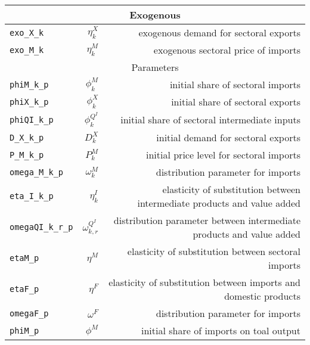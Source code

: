 \begin{center}
\begin{longtable}{lrr}
\hline
\multicolumn{3}{c}{Exogenous}\\%
\hline
\texttt{exo\_X\_k} & ${\eta^{X}_{k}}$ & exogenous demand for sectoral exports\\
\texttt{exo\_M\_k} & ${\eta^{M}_{k}}$ & exogenous sectoral price of imports\\
\hline
\multicolumn{3}{c}{Parameters}\\%
\hline
\texttt{phiM\_k\_p} & ${\phi^{M}_{k}}$ & initial share of sectoral imports\\
\texttt{phiX\_k\_p} & ${\phi^{X}_{k}}$ & initial share of sectoral exports\\
\texttt{phiQI\_k\_p} & ${\phi^{Q^{I}}_{k}}$ & initial share of sectoral intermediate inputs\\
\texttt{D\_X\_k\_p} & ${D^{X}_{k}}$ & initial demand for sectoral exports\\
\texttt{P\_M\_k\_p} & ${P^{M}_{k}}$ & initial price level for sectoral imports\\
\texttt{omega\_M\_k\_p} & ${\omega^{M}_{k}}$ & distribution parameter for imports\\
\texttt{eta\_I\_k\_p} & ${\eta^{I}_{k}}$ & elasticity of substitution between intermediate products and value added\\
\texttt{omegaQI\_k\_r\_p} & ${\omega^{Q^{I}}_{k,r}}$ & distribution parameter between intermediate products and value added\\
\texttt{etaM\_p} & ${\eta^{M}}$ & elasticity of substitution between sectoral imports\\
\texttt{etaF\_p} & ${\eta^{F}}$ & elasticity of substitution between imports and domestic products\\
\texttt{omegaF\_p} & ${\omega^{F}}$ & distribution parameter for imports\\
\texttt{phiM\_p} & ${\phi^{M}}$ & initial share of imports on toal output\\
\hline%
\end{longtable}
\end{center}
